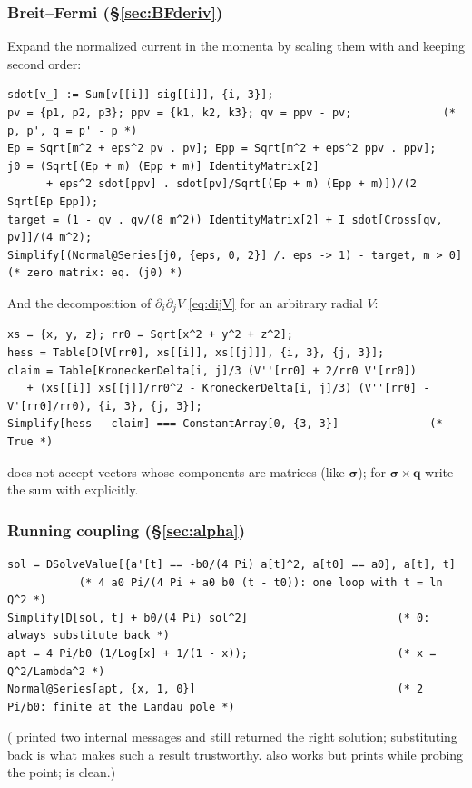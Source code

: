 \documentclass[11pt,a4paper]{article}
\numberwithin{equation}{section}
\theoremstyle{definition}
\theoremstyle{plain}
\theoremstyle{remark}
\numberwithin{algorithm}{section}
\newcommand{\vq}{\bm q}
\newcommand{\vsig}{\bm\sigma}
\begin{document}
\subsubsection{Breit--Fermi (\S\ref{sec:BFderiv})}
Expand the normalized current in the momenta by scaling them with  and keeping second order:
\begin{lstlisting}[style=wl]
sdot[v_] := Sum[v[[i]] sig[[i]], {i, 3}];
pv = {p1, p2, p3}; ppv = {k1, k2, k3}; qv = ppv - pv;              (* p, p', q = p' - p *)
Ep = Sqrt[m^2 + eps^2 pv . pv]; Epp = Sqrt[m^2 + eps^2 ppv . ppv];
j0 = (Sqrt[(Ep + m) (Epp + m)] IdentityMatrix[2]
      + eps^2 sdot[ppv] . sdot[pv]/Sqrt[(Ep + m) (Epp + m)])/(2 Sqrt[Ep Epp]);
target = (1 - qv . qv/(8 m^2)) IdentityMatrix[2] + I sdot[Cross[qv, pv]]/(4 m^2);
Simplify[(Normal@Series[j0, {eps, 0, 2}] /. eps -> 1) - target, m > 0]   (* zero matrix: eq. (j0) *)
\end{lstlisting}
And the decomposition of $\partial_i\partial_jV$ \eqref{eq:dijV} for an arbitrary radial $V$:
\begin{lstlisting}[style=wl]
xs = {x, y, z}; rr0 = Sqrt[x^2 + y^2 + z^2];
hess = Table[D[V[rr0], xs[[i]], xs[[j]]], {i, 3}, {j, 3}];
claim = Table[KroneckerDelta[i, j]/3 (V''[rr0] + 2/rr0 V'[rr0])
   + (xs[[i]] xs[[j]]/rr0^2 - KroneckerDelta[i, j]/3) (V''[rr0] - V'[rr0]/rr0), {i, 3}, {j, 3}];
Simplify[hess - claim] === ConstantArray[0, {3, 3}]              (* True *)
\end{lstlisting}
 does not accept vectors whose components are matrices (like $\vsig$); for $\vsig\times\vq$ write the sum with  explicitly.

\subsubsection{Running coupling (\S\ref{sec:alpha})}
\begin{lstlisting}[style=wl]
sol = DSolveValue[{a'[t] == -b0/(4 Pi) a[t]^2, a[t0] == a0}, a[t], t]
           (* 4 a0 Pi/(4 Pi + a0 b0 (t - t0)): one loop with t = ln Q^2 *)
Simplify[D[sol, t] + b0/(4 Pi) sol^2]                       (* 0: always substitute back *)
apt = 4 Pi/b0 (1/Log[x] + 1/(1 - x));                       (* x = Q^2/Lambda^2 *)
Normal@Series[apt, {x, 1, 0}]                               (* 2 Pi/b0: finite at the Landau pole *)
\end{lstlisting}
( printed two internal  messages and still returned the right solution; substituting back is what makes such a result trustworthy.  also works but prints  while probing the point;  is clean.)
\end{document}
